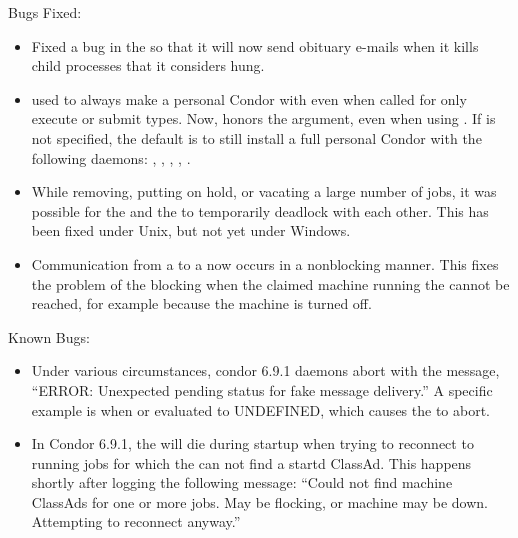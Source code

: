 \noindent Bugs Fixed:

\begin{itemize}

\item Fixed a bug in the  so that it will now send obituary
e-mails when it kills child processes that it considers hung.

\item {} used to always make a personal Condor with
 even when  called for only execute or
submit types.  Now,  honors the 
argument, even when using .
If  is not specified, the default is to still install a
full personal Condor with the following daemons: 
, ,
, , . 

\item While removing, putting on hold, or vacating a large number of
jobs, it was possible for the  and the  to
temporarily deadlock with each other.  This has been fixed under Unix,
but not yet under Windows.

\item Communication from a  to a 
now occurs in a nonblocking manner.
This fixes the problem of the  blocking 
when the claimed machine running the 
cannot be reached, for example because the machine is turned off.

\end{itemize}

\noindent Known Bugs:

\begin{itemize}

\item Under various circumstances, condor 6.9.1 daemons abort
with the message, ``ERROR: Unexpected pending status for fake message
delivery.''  A specific example is when  or
 evaluated to UNDEFINED, which causes the
 to abort.

\item In Condor 6.9.1, the  will die during startup
when trying to reconnect to running jobs for which the 
can not find a startd ClassAd.  This happens shortly after
logging the following message: ``Could not find machine ClassAds for
one or more jobs.  May be flocking, or machine may be down.
Attempting to reconnect anyway.''

\end{itemize}

